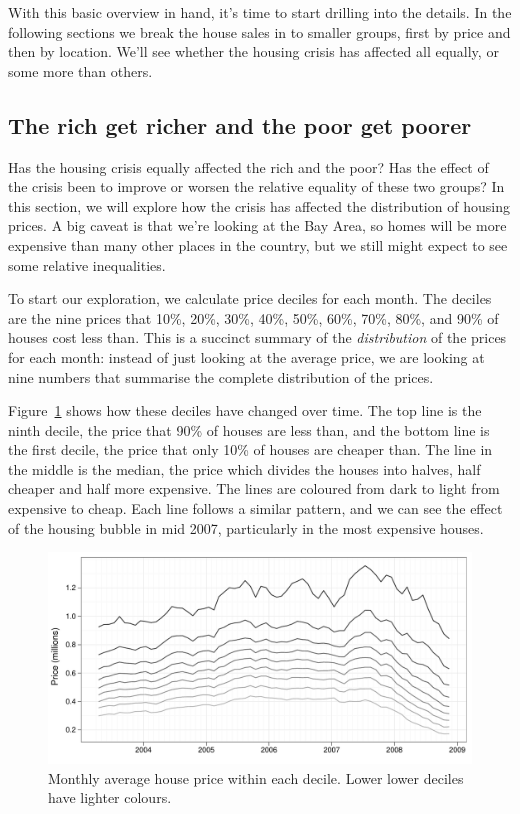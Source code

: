 \documentclass[oneside]{article}
\begin{document}
With this basic overview in hand, it's time to start drilling into the details. In the following sections we break the house sales in to smaller groups, first by price and then by location.  We'll see whether the housing crisis has affected all equally, or some more than others.

\subsection{The rich get richer and the poor get poorer}

Has the housing crisis equally affected the rich and the poor?  Has the effect of the crisis been to improve or worsen the relative equality of these two groups?  In this section, we will explore how the crisis has affected the distribution of housing prices.  A big caveat is that we're looking at the Bay Area, so homes will be more expensive than many other places in the country, but we still might expect to see some relative inequalities.

To start our exploration, we calculate price deciles for each month.  The deciles are the nine prices that 10\%, 20\%, 30\%, 40\%, 50\%, 60\%, 70\%, 80\%, and 90\% of houses cost less than.  This is a succinct summary of the {\it distribution} of the prices for each month: instead of just looking at the average price, we are looking at nine numbers that summarise the complete distribution of the prices. 

Figure~\ref{fig:decile-raw} shows how these deciles have changed over time.  The top line is the ninth decile, the price that 90\% of houses are less than, and the bottom line is the first decile, the price that only 10\% of houses are cheaper than.  The line in the middle is the median, the price which divides the houses into halves, half cheaper and half more expensive.  The lines are coloured from dark to light from expensive to cheap.  Each line follows a similar pattern, and we can see the effect of the housing bubble in mid 2007, particularly in the most expensive houses.  

\begin{figure}[htbp]
  \centering
  \includegraphics[width=0.75\linewidth]{decile-raw}
  \caption{Monthly average house price within each decile.  Lower lower deciles have lighter colours.} 
  \label{fig:decile-raw}
\end{figure}
\end{document}
